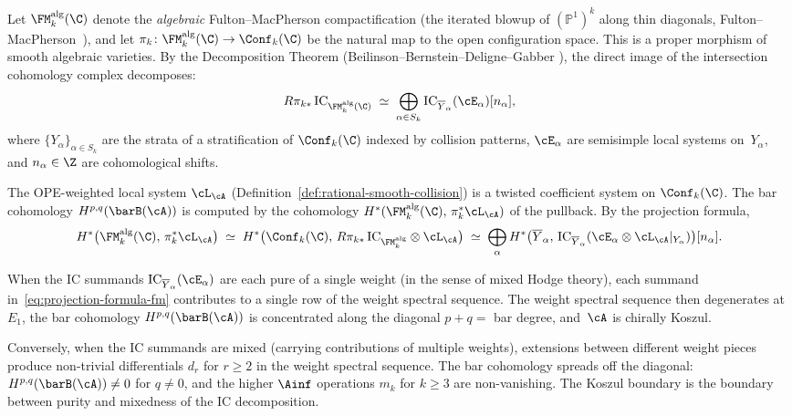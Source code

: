 \begin{proposition}
\label{prop:decomposition-fm}
Let $\FM_k^{\mathrm{alg}}(\C)$ denote the \emph{algebraic}
Fulton--MacPherson compactification \textup{(}the iterated blowup of
$(\mathbb{P}^1)^k$ along thin diagonals,
Fulton--MacPherson~\textup{\cite{FM94}),} and let
$\pi_k\colon \FM_k^{\mathrm{alg}}(\C) \to \Conf_k(\C)$ be the
natural map to the open configuration space. This is a proper
morphism of smooth algebraic varieties. By the Decomposition
Theorem \textup{(}Beilinson--Bernstein--Deligne--Gabber
\textup{\cite{BBD82}),} the direct image of the intersection
cohomology complex decomposes:
\begin{equation}
\label{eq:decomposition-fm}
R\pi_{k*}\, \IC_{\FM_k^{\mathrm{alg}}(\C)}
\;\simeq\;
\bigoplus_{\alpha \in S_k}
\IC_{\overline{Y}_\alpha}(\cE_\alpha)[n_\alpha],
\end{equation}
where $\{Y_\alpha\}_{\alpha \in S_k}$ are the strata of a
stratification of $\Conf_k(\C)$ indexed by collision patterns,
$\cE_\alpha$ are semisimple local systems on~$Y_\alpha$, and
$n_\alpha \in \Z$ are cohomological shifts.

The OPE-weighted local system $\cL_\cA$
\textup{(}Definition~\textup{\ref{def:rational-smooth-collision})}
is a twisted coefficient system on $\Conf_k(\C)$. The bar
cohomology $H^{p,q}(\barB(\cA))$ is computed by the
cohomology $H^*(\FM_k^{\mathrm{alg}}(\C),\, \pi_k^*\cL_\cA)$ of the
pullback. By the projection formula,
\begin{equation}
\label{eq:projection-formula-fm}
H^*\bigl(\FM_k^{\mathrm{alg}}(\C),\, \pi_k^*\cL_\cA\bigr)
\;\simeq\;
H^*\bigl(\Conf_k(\C),\,
R\pi_{k*}\,\IC_{\FM_k^{\mathrm{alg}}} \otimes \cL_\cA\bigr)
\;\simeq\;
\bigoplus_\alpha
H^*\bigl(\overline{Y}_\alpha,\,
\IC_{\overline{Y}_\alpha}(\cE_\alpha \otimes \cL_\cA|_{Y_\alpha})
\bigr)[n_\alpha].
\end{equation}

When the IC summands $\IC_{\overline{Y}_\alpha}(\cE_\alpha)$ are
each pure of a single weight \textup{(}in the sense of mixed Hodge
theory\textup{),} each summand in~\eqref{eq:projection-formula-fm}
contributes to a single row of the weight spectral sequence.
The weight spectral sequence then degenerates at~$E_1$, the bar
cohomology $H^{p,q}(\barB(\cA))$ is concentrated along the
diagonal $p + q = $ bar degree, and~$\cA$ is chirally Koszul.

Conversely, when the IC summands are mixed (carrying contributions
of multiple weights), extensions between different weight pieces
produce non-trivial differentials $d_r$ for $r \ge 2$ in the weight
spectral sequence. The bar cohomology spreads off the diagonal:
$H^{p,q}(\barB(\cA)) \neq 0$ for $q \neq 0$, and
the higher $\Ainf$ operations $m_k$ for $k \geq 3$ are
non-vanishing. The Koszul boundary is the boundary between purity
and mixedness of the IC decomposition.
\end{proposition}

